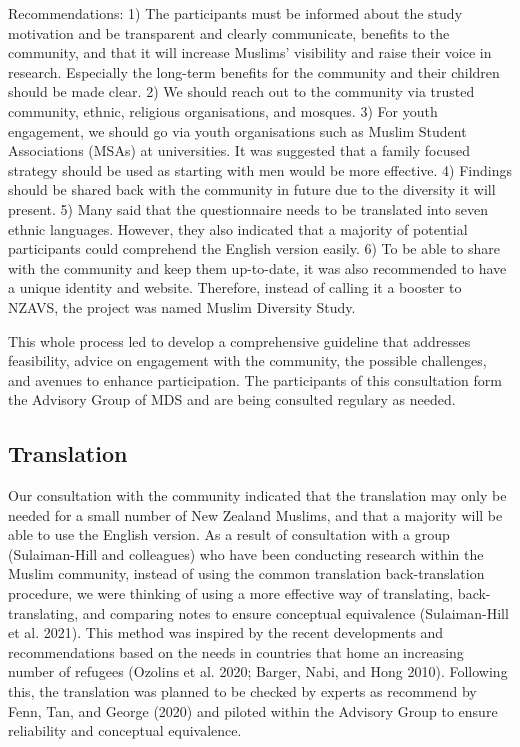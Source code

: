 \documentclass[
]{interact}
\begin{document}
Recommendations: 1) The participants must be informed about the study
motivation and be transparent and clearly communicate, benefits to the
community, and that it will increase Muslims' visibility and raise their
voice in research. Especially the long-term benefits for the community
and their children should be made clear. 2) We should reach out to the
community via trusted community, ethnic, religious organisations, and
mosques. 3) For youth engagement, we should go via youth organisations
such as Muslim Student Associations (MSAs) at universities. It was
suggested that a family focused strategy should be used as starting with
men would be more effective. 4) Findings should be shared back with the
community in future due to the diversity it will present. 5) Many said
that the questionnaire needs to be translated into seven ethnic
languages. However, they also indicated that a majority of potential
participants could comprehend the English version easily. 6) To be able
to share with the community and keep them up-to-date, it was also
recommended to have a unique identity and website. Therefore, instead of
calling it a booster to NZAVS, the project was named Muslim Diversity
Study.

This whole process led to develop a comprehensive guideline that
addresses feasibility, advice on engagement with the community, the
possible challenges, and avenues to enhance participation. The
participants of this consultation form the Advisory Group of MDS and are
being consulted regulary as needed.

\subsection{Translation}\label{translation}

Our consultation with the community indicated that the translation may
only be needed for a small number of New Zealand Muslims, and that a
majority will be able to use the English version. As a result of
consultation with a group (Sulaiman-Hill and colleagues) who have been
conducting research within the Muslim community, instead of using the
common translation back-translation procedure, we were thinking of using
a more effective way of translating, back-translating, and comparing
notes to ensure conceptual equivalence (Sulaiman-Hill et al. 2021). This
method was inspired by the recent developments and recommendations based
on the needs in countries that home an increasing number of refugees
(Ozolins et al. 2020; Barger, Nabi, and Hong 2010). Following this, the
translation was planned to be checked by experts as recommend by Fenn,
Tan, and George (2020) and piloted within the Advisory Group to ensure
reliability and conceptual equivalence.
\end{document}

